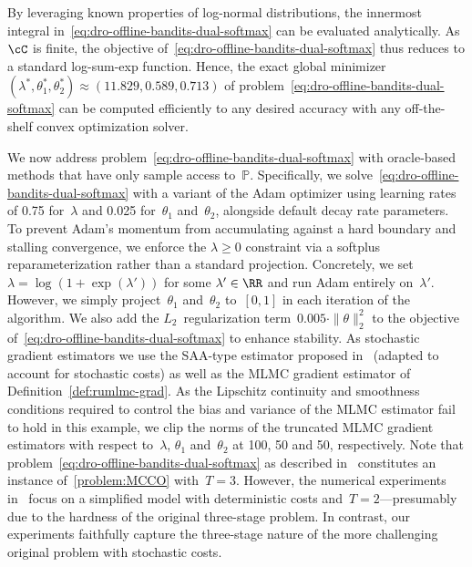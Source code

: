 \documentclass[11pt]{article}
\begin{document}
By leveraging known properties of log-normal distributions, the innermost integral in~\eqref{eq:dro-offline-bandits-dual-softmax} can be evaluated analytically. As~$\cC$ is finite, the objective of~\eqref{eq:dro-offline-bandits-dual-softmax} thus reduces to a standard log-sum-exp function. Hence, the exact global minimizer $(\lambda^*, \theta_1^*, \theta_2^*) \approx (11.829, 0.589, 0.713)$ of problem~\eqref{eq:dro-offline-bandits-dual-softmax}
can be computed efficiently to any desired accuracy with any off-the-shelf convex optimization solver.

We now address problem~\eqref{eq:dro-offline-bandits-dual-softmax} with oracle-based methods that have only sample access to~$\mathbb P$. Specifically, we solve~\eqref{eq:dro-offline-bandits-dual-softmax} with a variant of the Adam optimizer using learning rates of 0.75 for~$\lambda$ and 0.025 for~$\theta_1$ and~$\theta_2$, alongside default decay rate parameters. To prevent Adam's momentum from accumulating against a hard boundary and stalling convergence, we enforce the $\lambda \geq 0$ constraint via a softplus reparameterization rather than a standard projection. Concretely, we set $\lambda=\log(1+\exp(\lambda'))$ for some $\lambda'\in\RR$ and run Adam entirely on~$\lambda'$. However, we simply project~$\theta_1$ and~$\theta_2$ to~$[0,1]$ in each iteration of the algorithm. We also add the $L_2$~regularization term~$0.005\cdot\|\theta\|_2^2$ to the objective of~\eqref{eq:dro-offline-bandits-dual-softmax} to enhance stability. As stochastic gradient estimators we use the SAA-type estimator proposed in~\cite{shen2024wasserstein} (adapted to account for stochastic costs) as well as the MLMC gradient estimator of Definition~\ref{def:rumlmc-grad}. As the Lipschitz continuity and smoothness conditions required to control the bias and variance of the MLMC estimator fail to hold in this example, we clip the norms of the truncated MLMC gradient estimators with respect to~$\lambda$, $\theta_1$ and~$\theta_2$ at 100, 50 and 50, respectively. Note that problem~\eqref{eq:dro-offline-bandits-dual-softmax} as described in~\citep{shen2024wasserstein} constitutes an instance of~\eqref{problem:MCCO} with~$T=3$. However, the numerical experiments in~\citep{shen2024wasserstein} focus on a simplified model with deterministic costs and~$T=2$---presumably due to the hardness of the original three-stage problem. In contrast, our experiments faithfully capture the three-stage nature of the more challenging original problem with stochastic costs. 
\end{document}
